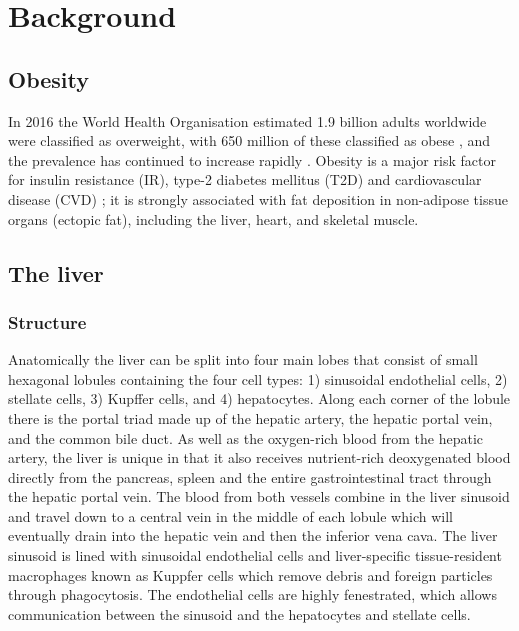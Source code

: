 \chapter{\label{ch:1-background}Background} 

\minitoc

\section{Obesity}

In 2016 the World Health Organisation estimated 1.9 billion adults worldwide were classified as overweight, with 650 million of these classified as obese  \cite{WHO2016factsheetObesityOverweight}, and the prevalence has continued to increase rapidly \cite{WHO2016factsheetObesityOverweight, Finucane2011NationalParticipants}. Obesity is a major risk factor for insulin resistance (IR), type-2 diabetes mellitus (T2D) and cardiovascular disease (CVD) \cite{Reaven1995PathophysiologyDisease, DeFronzo2015TypeMellitus, Khan2018AssociationMorbidity}; it is strongly associated with fat deposition in non-adipose tissue organs (ectopic fat), including the liver, heart, and skeletal muscle.

\section{The liver}

\subsection{Structure}

Anatomically the liver can be split into four main lobes that consist of small hexagonal lobules containing the four cell types: 1) sinusoidal endothelial cells, 2) stellate cells, 3) Kupffer cells, and 4) hepatocytes. Along each corner of the lobule there is the portal triad made up of the hepatic artery, the hepatic portal vein, and the common bile duct. As well as the oxygen-rich blood from the hepatic artery, the liver is unique in that it also receives nutrient-rich deoxygenated blood directly from the pancreas, spleen and the entire gastrointestinal tract through the hepatic portal vein. The blood from both vessels combine in the liver sinusoid and travel down to a central vein in the middle of each lobule which will eventually drain into the hepatic vein and then the inferior vena cava. The liver sinusoid is lined with sinusoidal endothelial cells and liver-specific tissue-resident macrophages known as Kuppfer cells which remove debris and foreign particles through phagocytosis. The endothelial cells are highly fenestrated, which allows communication between the sinusoid and the hepatocytes and stellate cells.

